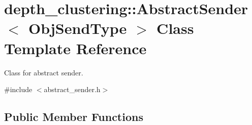 \hypertarget{classdepth__clustering_1_1AbstractSender}{}\section{depth\+\_\+clustering\+:\+:Abstract\+Sender$<$ Obj\+Send\+Type $>$ Class Template Reference}
\label{classdepth__clustering_1_1AbstractSender}


Class for abstract sender.  




{\ttfamily \#include $<$abstract\+\_\+sender.\+h$>$}

\subsection*{Public Member Functions}
